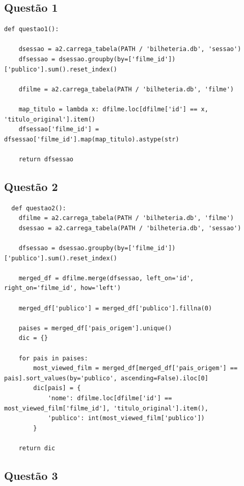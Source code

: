 \documentclass{article}
\begin{document}
\subsection*{Questão 1}
\begin{lstlisting}
def questao1():
    
    dsessao = a2.carrega_tabela(PATH / 'bilheteria.db', 'sessao')
    dfsessao = dsessao.groupby(by=['filme_id'])['publico'].sum().reset_index()

    dfilme = a2.carrega_tabela(PATH / 'bilheteria.db', 'filme')
    
    map_titulo = lambda x: dfilme.loc[dfilme['id'] == x, 'titulo_original'].item()
    dfsessao['filme_id'] =  dfsessao['filme_id'].map(map_titulo).astype(str)
    
    return dfsessao
\end{lstlisting}
\subsection*{Questão 2}

\begin{lstlisting}
  def questao2():
    dfilme = a2.carrega_tabela(PATH / 'bilheteria.db', 'filme')
    dsessao = a2.carrega_tabela(PATH / 'bilheteria.db', 'sessao')
    
    dfsessao = dsessao.groupby(by=['filme_id'])['publico'].sum().reset_index()
    
    merged_df = dfilme.merge(dfsessao, left_on='id', right_on='filme_id', how='left')
    
    merged_df['publico'] = merged_df['publico'].fillna(0)
    
    paises = merged_df['pais_origem'].unique()
    dic = {}
    
    for pais in paises:
        most_viewed_film = merged_df[merged_df['pais_origem'] == pais].sort_values(by='publico', ascending=False).iloc[0]
        dic[pais] = {
            'nome': dfilme.loc[dfilme['id'] == most_viewed_film['filme_id'], 'titulo_original'].item(),
            'publico': int(most_viewed_film['publico'])
        }
    
    return dic
\end{lstlisting}
\subsection*{Questão 3}
\end{document}
